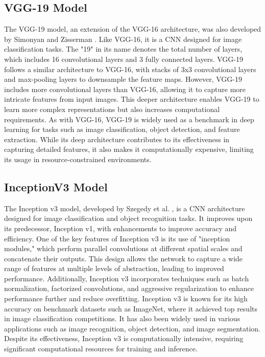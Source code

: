 \subsection{VGG-19 Model}
The VGG-19 model, an extension of the VGG-16 architecture, was also developed by Simonyan and Zisserman \cite{Simonyan2015} \cite{Jain2020}. Like VGG-16, it is a CNN designed for image classification tasks. The "19" in its name denotes the total number of layers, which includes 16 convolutional layers and 3 fully connected layers. VGG-19 follows a similar architecture to VGG-16, with stacks of 3x3 convolutional layers and max-pooling layers to downsample the feature maps. However, VGG-19 includes more convolutional layers than VGG-16, allowing it to capture more intricate features from input images. This deeper architecture enables VGG-19 to learn more complex representations but also increases computational requirements. As with VGG-16, VGG-19 is widely used as a benchmark in deep learning for tasks such as image classification, object detection, and feature extraction. While its deep architecture contributes to its effectiveness in capturing detailed features, it also makes it computationally expensive, limiting its usage in resource-constrained environments.

\subsection{InceptionV3 Model}
The Inception v3 model, developed by Szegedy et al. \cite{Szegedy2016} \cite{Jain2020}, is a CNN architecture designed for image classification and object recognition tasks. It improves upon its predecessor, Inception v1, with enhancements to improve accuracy and efficiency. One of the key features of Inception v3 is its use of "inception modules," which perform parallel convolutions at different spatial scales and concatenate their outputs. This design allows the network to capture a wide range of features at multiple levels of abstraction, leading to improved performance. Additionally, Inception v3 incorporates techniques such as batch normalization, factorized convolutions, and aggressive regularization to enhance performance further and reduce overfitting. Inception v3 is known for its high accuracy on benchmark datasets such as ImageNet, where it achieved top results in image classification competitions. It has also been widely used in various applications such as image recognition, object detection, and image segmentation. Despite its effectiveness, Inception v3 is computationally intensive, requiring significant computational resources for training and inference.

